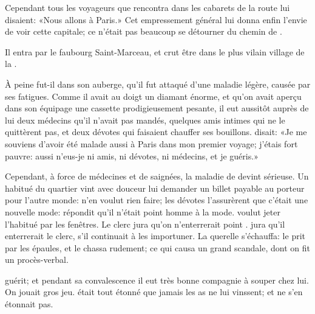 Cependant tous les voyageurs que  rencontra dans les cabarets de
la route lui disaient: «Nous allons à Paris.» Cet empressement général
lui donna enfin l’envie de voir cette capitale; ce n’était pas beaucoup
se détourner du chemin de  .

Il entra par le faubourg Saint-Marceau, et crut être dans le plus
vilain village de la .


À peine  fut-il dans son auberge, qu’il fut attaqué d’une
maladie légère, causée par ses fatigues. Comme il avait au doigt un
diamant énorme, et qu’on avait aperçu dans son équipage une cassette
prodigieusement pesante, il eut aussitôt auprès de lui deux médecins
qu’il n’avait pas mandés, quelques amis intimes qui ne le quittèrent
pas, et deux dévotes qui faisaient chauffer ses bouillons. 
disait: «Je me souviens d’avoir été malade aussi à Paris dans mon 
premier voyage; j’étais fort pauvre: aussi n’eus-je ni amis, ni
dévotes, ni médecins, et je guéris.»

Cependant, à force de médecines et de saignées, la maladie de 
devint sérieuse. Un habitué du quartier vint avec douceur lui demander
un billet payable au porteur pour l’autre monde:  n’en voulut
rien faire; les dévotes l’assurèrent que c’était une nouvelle mode:
 répondit qu’il n’était point homme à la mode.  voulut
jeter l’habitué par les fenêtres. Le clerc jura qu’on n’enterrerait
point .  jura qu’il enterrerait le clerc, s’il continuait
à les importuner. La querelle s’échauffa:  le prit par les
épaules, et le chassa rudement; ce qui causa un grand scandale, dont on
fit un procès-verbal.

 guérit; et pendant sa convalescence il eut très bonne compagnie
à souper chez lui. On jouait gros jeu.  était tout étonné que
jamais les as ne lui vinssent; et  ne s’en étonnait pas.

